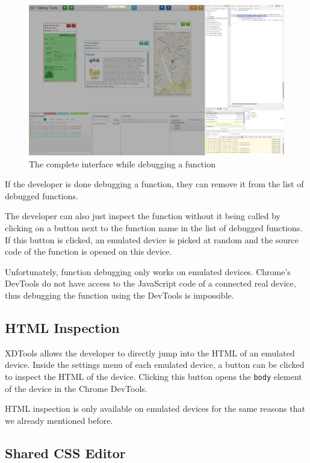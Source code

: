 \begin{figure}[H]
  \centering
    \includegraphics[width=1.0\textwidth]{images/screenshots/function_debugging_complete.png}
	\caption[Screenshot: Function debugging]{The complete interface while debugging a function}
	\label{fig:function_debugging_complete}
\end{figure}

If the developer is done debugging a function, they can remove it from the list of debugged functions.

The developer can also just inspect the function without it being called by clicking on a button next to the function name in the list of debugged functions. If this button is clicked, an emulated device is picked at random and the source code of the function is opened on this device. 

Unfortunately, function debugging only works on emulated devices. Chrome's DevTools do not have access to the JavaScript code of a connected real device, thus debugging the function using the DevTools is impossible.

\subsection{HTML Inspection}

XDTools allows the developer to directly jump into the HTML of an emulated device. Inside the settings menu of each emulated device, a button can be clicked to inspect the HTML of the device. Clicking this button opens the \lstinline|body| element of the device in the Chrome DevTools. 

HTML inspection is only available on emulated devices for the same reasons that we already mentioned before.

\subsection{Shared CSS Editor}

